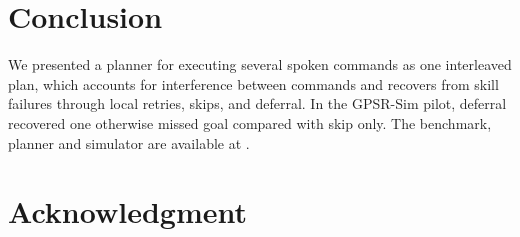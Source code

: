 \documentclass[conference]{IEEEtran}
\newcommand{\todo}[1]{}
\newcommand{\todo}[1]{\textcolor{red}{[TODO: #1]}}
\begin{document}
\section{Conclusion}
We presented a planner for executing several spoken commands as one
interleaved plan, which accounts for interference between commands and
recovers from skill failures through local retries, skips, and deferral.
In the GPSR-Sim pilot, deferral recovered one otherwise missed goal compared
with skip only. The benchmark, planner and simulator are available at
\todo{URL}.

\section*{Acknowledgment}
\todo{Team, funding.}
\end{document}
